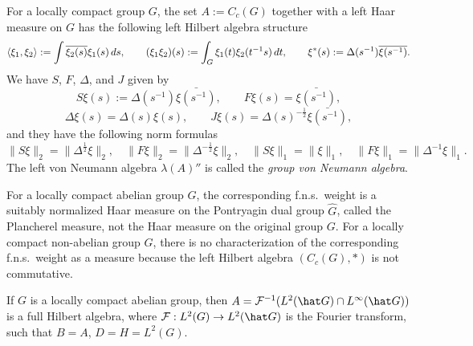 \documentclass{../../small}
\begin{document}
\begin{ex}
For a locally compact group $G$, the set $A:=C_c(G)$ together with a left Haar measure on $G$ has the following left Hilbert algebra structure
\[\langle\xi_1,\xi_2\rangle:=\int\overline{\xi_2(s)}\xi_1(s)\,ds,\qquad(\xi_1\xi_2)(s):=\int_G\xi_1(t)\xi_2(t^{-1}s)\,dt,\qquad\xi^*(s):=\Delta(s^{-1})\overline{\xi(s^{-1})}.\]
We have $S$, $F$, $\Delta$, and $J$ given by
\[S\xi(s):=\Delta(s^{-1})\bar{\xi(s^{-1})},\qquad F\xi(s)=\bar{\xi(s^{-1})},\]
\[\Delta\xi(s)=\Delta(s)\xi(s),\qquad J\xi(s)=\Delta(s)^{-\frac12}\bar{\xi(s^{-1})},\]
and they have the following norm formulas
\[\|S\xi\|_2=\|\Delta^{\frac12}\xi\|_2,\quad\|F\xi\|_2=\|\Delta^{-\frac12}\xi\|_2,\quad\|S\xi\|_1=\|\xi\|_1,\quad\|F\xi\|_1=\|\Delta^{-1}\xi\|_1.\]
The left von Neumann algebra $\lambda(A)''$ is called the \emph{group von Neumann algebra}.
\iffalse
The left involution $S$ is an isometric anti-linear automorphism of $L^1(G)=L^1(G,ds)$, but the right involution $F$ defines an isometric anti-linear isomorphism between $L^1(G,ds)$ and $L^1(G,ds^{-1})$.
To sum up,
\[\begin{array}{lrl}
\xi\in H &\Leftrightarrow& \|\xi\|_2<\infty,\\
\xi\in D &\Leftrightarrow& \|S\xi\|_2+\|\xi\|_2<\infty,\\
\xi\in A &\Rightarrow& \|\lambda(\xi)\|+\|S\xi\|_2+\|\xi\|_2<\infty,\\
\xi\in B' &\Leftrightarrow& \|\rho(\xi)\|+\|\xi\|_2<\infty,\\
\xi\in D' &\Leftrightarrow& \|F\xi\|_2+\|\xi\|_2<\infty,\\
\xi\in A' &\Leftrightarrow& \|\rho(\xi)\|+\|F\xi\|_2+\|\xi\|_2<\infty,\\
\xi\in B &\Leftrightarrow& \|\lambda(\xi)\|+\|\xi\|_2<\infty,\\
\xi\in A'' &\Leftrightarrow& \|\lambda(\xi)\|+\|S\xi\|_2+\|\xi\|_2<\infty.
\end{array}\]
\fi

For a locally compact abelian group $G$, the corresponding f.n.s.~weight is a suitably normalized Haar measure on the Pontryagin dual group $\hat G$, called the Plancherel measure, not the Haar measure on the original group $G$.
For a locally compact non-abelian group $G$, there is no characterization of the corresponding f.n.s.~weight as a measure because the left Hilbert algebra $(C_c(G),*)$ is not commutative.
\end{ex}

\begin{ex}
If $G$ is a locally compact abelian group, then $A=\cF^{-1}(L^2(\hat G)\cap L^\infty(\hat G))$ is a full Hilbert algebra, where $\cF:L^2(G)\to L^2(\hat G)$ is the Fourier transform, such that $B=A$, $D=H=L^2(G)$.
\end{ex}
\end{document}
